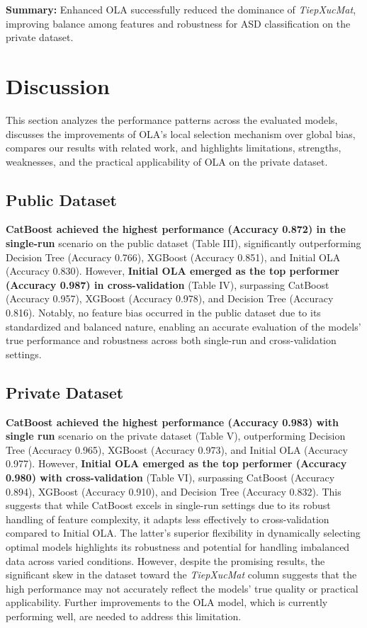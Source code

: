 \documentclass[conference]{IEEEtran}
\begin{document}
\noindent\textbf{Summary:} Enhanced OLA successfully reduced the dominance of \textit{TiepXucMat}, improving balance among features and robustness for ASD classification on the private dataset.

\section{Discussion}
This section analyzes the performance patterns across the evaluated models, discusses the improvements of OLA's local selection mechanism over global bias, compares our results with related work, and highlights limitations, strengths, weaknesses, and the practical applicability of OLA on the private dataset.

\subsection{Public Dataset} \textbf{CatBoost achieved the highest performance (Accuracy 0.872) in the single-run} scenario on the public dataset (Table III), significantly outperforming Decision Tree (Accuracy 0.766), XGBoost (Accuracy 0.851), and Initial OLA (Accuracy 0.830). However, \textbf{Initial OLA emerged as the top performer (Accuracy 0.987) in cross-validation} (Table IV), surpassing CatBoost (Accuracy 0.957), XGBoost (Accuracy 0.978), and Decision Tree (Accuracy 0.816). Notably, no feature bias occurred in the public dataset due to its standardized and balanced nature, enabling an accurate evaluation of the models’ true performance and robustness across both single-run and cross-validation settings.

\subsection{Private Dataset} \textbf{CatBoost achieved the highest performance (Accuracy 0.983) with single run} scenario on the private dataset (Table V), outperforming Decision Tree (Accuracy 0.965), XGBoost (Accuracy 0.973), and Initial OLA (Accuracy 0.977). However, \textbf{Initial OLA emerged as the top performer (Accuracy 0.980) with cross-validation} (Table VI), surpassing CatBoost (Accuracy 0.894), XGBoost (Accuracy 0.910), and Decision Tree (Accuracy 0.832). This suggests that while CatBoost excels in single-run settings due to its robust handling of feature complexity, it adapts less effectively to cross-validation compared to Initial OLA. The latter’s superior flexibility in dynamically selecting optimal models highlights its robustness and potential for handling imbalanced data across varied conditions. However, despite the promising results, the significant skew in the dataset toward the \textit{TiepXucMat} column suggests that the high performance may not accurately reflect the models’ true quality or practical applicability. Further improvements to the OLA model, which is currently performing well, are needed to address this limitation.
\end{document}
